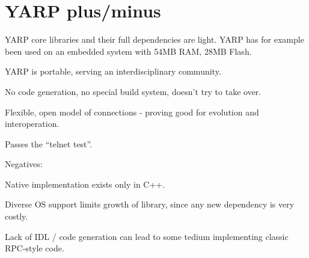 \documentclass[letterpaper]{article}
\begin{document}
\section{YARP plus/minus}

YARP core libraries and their full dependencies are light.
YARP has for example been used on an embedded system
with 54MB RAM, 28MB Flash.

YARP is portable, serving an interdisciplinary community.

No code generation, no special build system, doesn't try to take over.

Flexible, open model of connections - proving good for evolution and interoperation.

Passes the ``telnet test''.

Negatives:

Native implementation exists only in C++.  

Diverse OS support limits growth of library, since any
new dependency is very costly.

Lack of IDL / code generation can lead to some tedium
implementing classic RPC-style code.




\end{document}

